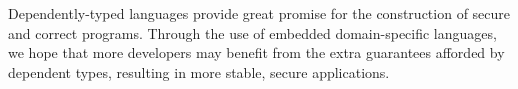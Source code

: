 Dependently-typed languages provide great promise for the construction of
secure and correct programs. Through the use of embedded domain-specific
languages, we hope that more developers may benefit from the extra guarantees
afforded by dependent types, resulting in more stable, secure applications.


